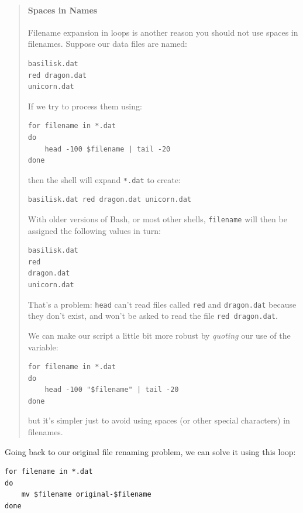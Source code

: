 \documentclass[]{book}
\newcommand{\gdef}[2]{\emph{#2}}
\begin{document}
\begin{quote}
\mbox{}\paragraph{Spaces in Names}

Filename expansion in loops is another reason you should not use spaces
in filenames. Suppose our data files are named:

\begin{verbatim}
basilisk.dat
red dragon.dat
unicorn.dat
\end{verbatim}

If we try to process them using:

\begin{verbatim}
for filename in *.dat
do
    head -100 $filename | tail -20
done
\end{verbatim}

then the shell will expand \texttt{*.dat} to create:

\begin{verbatim}
basilisk.dat red dragon.dat unicorn.dat
\end{verbatim}

With older versions of Bash, or most other shells, \texttt{filename}
will then be assigned the following values in turn:

\begin{verbatim}
basilisk.dat
red
dragon.dat
unicorn.dat
\end{verbatim}

That's a problem: \texttt{head} can't read files called \texttt{red} and
\texttt{dragon.dat} because they don't exist, and won't be asked to read
the file \texttt{red dragon.dat}.

We can make our script a little bit more robust by
\gdef{g:shell-quoting}{quoting} our use of the variable:

\begin{verbatim}
for filename in *.dat
do
    head -100 "$filename" | tail -20
done
\end{verbatim}

but it's simpler just to avoid using spaces (or other special
characters) in filenames.
\end{quote}

Going back to our original file renaming problem, we can solve it using
this loop:

\begin{verbatim}
for filename in *.dat
do
    mv $filename original-$filename
done
\end{verbatim}
\end{document}
